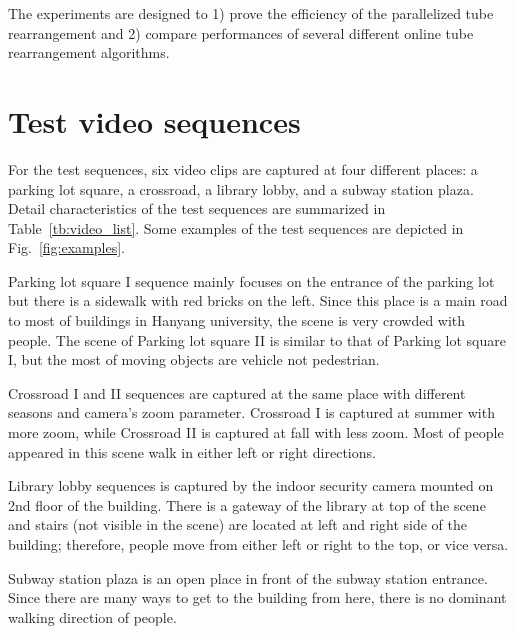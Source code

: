 \documentclass[11pt]{hyu_thesis}
\begin{document}
The experiments are designed to 1) prove the efficiency of the parallelized tube rearrangement and 2) compare performances of several different online tube rearrangement algorithms.

\section{Test video sequences}
For the test sequences, six video clips are captured at four different places: a parking lot square, a crossroad, a library lobby, and a subway station plaza. Detail characteristics of the test sequences are summarized in Table~\ref{tb:video_list}. Some examples of the test sequences are depicted in Fig.~\ref{fig:examples}.

Parking lot square I sequence mainly focuses on the entrance of the parking lot but there is a sidewalk with red bricks on the left. Since this place is a main road to most of buildings in Hanyang university, the scene is very crowded with people. The scene of Parking lot square II is similar to that of Parking lot square I, but the most of moving objects are vehicle not pedestrian.

Crossroad I and II sequences are captured at the same place with different seasons and camera's zoom parameter. Crossroad I is captured at summer with more zoom, while Crossroad II is captured at fall with less zoom. Most of people appeared in this scene walk in either left or right directions.

Library lobby sequences is captured by the indoor security camera mounted on 2nd floor of the building. There is a gateway of the library at top of the scene and stairs (not visible in the scene) are located at left and right side of the building; therefore, people move from either left or right to the top, or vice versa.

Subway station plaza is an open place in front of the subway station entrance. Since there are many ways to get to the building from here, there is no dominant walking direction of people.
\end{document}
